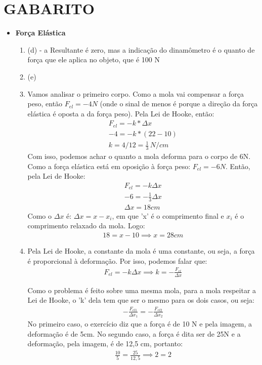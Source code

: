 \documentclass[12pt,letterpaper,fleqn]{article}
\begin{document}
\section*{GABARITO}
\begin{itemize}
    \item \textbf{Força Elástica}
\begin{enumerate}
    \item (d) - a Resultante é zero, mas a indicação do dinamômetro é o quanto de força que ele aplica no objeto, que é 100 N
    
    \item (e)
    \item Vamos analisar o primeiro corpo. Como a mola vai compensar a força peso, então $F_{el} = -4N$ (onde o sinal de menos é porque a direção da força elástica é oposta a da força peso). Pela Lei de Hooke, então:
    \begin{align*}
        F_{el} = -k*\Delta x \\
        -4 = -k*(22-10)\\
        k = 4/12 = \frac{1}{3}\, N/cm
    \end{align*}
    Com isso, podemos achar o quanto a mola deforma para o corpo de 6N. Como a força elástica está em oposição à força peso: $F_{el}= -6 N$. Então, pela Lei de Hooke:
    \begin{align*}
        F_{el}=-k\Delta x \\
        -6 = -\frac{1}{3} \Delta x \\
        \Delta x = 18 cm
    \end{align*}
    Como o $\Delta x$ é: $\Delta x = x - x_i$, em que 'x' é o comprimento final e $x_i$ é o comprimento relaxado da mola.
    Logo:
    \begin{align*}
        18 = x - 10 \implies \boxed{x = 28 cm}
    \end{align*}
    
    \item Pela Lei de Hooke, a constante da mola é uma constante, ou seja, a força é proporcional à deformação. Por isso, podemos falar que:
    \begin{align*}
        F_{el} = -k\Delta x \implies k = -\frac{F_{el}}{\Delta x}
    \end{align*}
    
    Como o problema é feito sobre uma mesma mola, para a mola respeitar a Lei de Hooke, o 'k' dela tem que ser o mesmo para os dois casos, ou seja:
    \begin{align*}
        -\frac{F_{el1}}{\Delta x_1} = -\frac{F_{el2}}{\Delta x_2}
    \end{align*}
    No primeiro caso, o exercício diz que a força é de 10 N e pela imagem, a deformação é de 5cm. No segundo caso, a força é dita ser de 25N e a deformação, pela imagem, é de 12,5 cm, portanto:
    \begin{align*}
        \frac{10}{5} = \frac{25}{12,5} \implies 2 =2
    \end{align*}
    

\end{enumerate}
\end{itemize}
\end{document}
